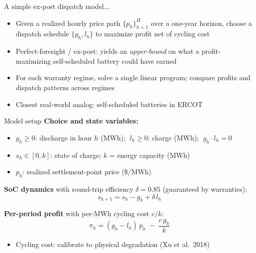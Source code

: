 \documentclass[aspectratio=169]{beamer}
\begin{document}
\begin{frame}{A simple ex-post dispatch model...}

\begin{itemize}
    \item Given a realized hourly price path $\{p_h\}_{h=1}^{H}$ over a one-year horizon, choose a dispatch schedule $\{g_h, l_h\}$ to maximize profit net of cycling cost
    \item Perfect-foresight / ex-post: yields an \textit{upper-bound} on what a profit-maximizing self-scheduled battery could have earned
    \item For each warranty regime, solve a single linear program; compare profits and dispatch patterns across regimes
    \item Closest real-world analog: self-scheduled batteries in ERCOT
\end{itemize}
\end{frame}

\begin{frame}{Model setup}
\textbf{Choice and state variables:}
\begin{itemize}
    \item $g_h \geq 0$: discharge in hour $h$ (MWh); $\;l_h \geq 0$: charge (MWh); $\;g_h \cdot l_h = 0$
    \item $s_h \in [0, k]$: state of charge; $k$ = energy capacity (MWh)
    \item $p_h$: realized settlement-point price (\$/MWh)
\end{itemize}

\vspace{0.2cm}
\textbf{SoC dynamics} with round-trip efficiency $\delta = 0.85$ (guaranteed by warranties):
\[
s_{h+1} = s_h - g_h + \delta\, l_h
\]

\textbf{Per-period profit} with per-MWh cycling cost $c/k$:
\[
\pi_h = (g_h - l_h)\,p_h \;-\; \frac{c\,g_h}{k}
\]
\begin{itemize}
    \item Cycling cost: calibrate to physical degradation (Xu et al.\ 2018)
\end{itemize}
\end{frame}
\end{document}

